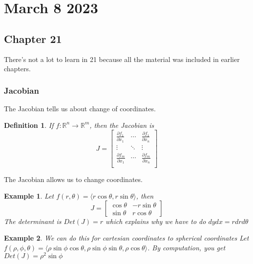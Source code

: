 \documentclass[11pt]{article}
\newtheorem{defn}{Definition}
\newtheorem{ex}{Example}
\begin{document}
            \section{March 8 2023}
            \subsection{Chapter 21}
            There's not a lot to learn in 21 because all the material was included in earlier chapters.
            \subsubsection{Jacobian}
            The Jacobian tells us about change of coordinates.
            \begin{defn}
              If $f: \mathbb{R}^{n} \to \mathbb{R}^{m}$, then the Jacobian is
              \[J =\begin{bmatrix}
                     \frac{\partial f_{1}}{\partial x_{1}} & \cdots & \frac{\partial f_{1}}{\partial x_{n}} \\
                     \vdots & \ddots & \vdots \\

                     \frac{\partial f_{m}}{\partial x_{1}} & \cdots & \frac{\partial f_{m}}{\partial x_{n}} \\
                   \end{bmatrix}\]
            \end{defn}
            The Jacobian allows us to change coordinates.
            \begin{ex}
              Let $f(r,\theta) = \langle r\cos\theta, r\sin\theta \rangle $,
              then
              \[J = \begin{bmatrix} \cos\theta  & -r\sin\theta \\ \sin\theta & r\cos\theta \end{bmatrix}\]
              The determinant is $Det(J) = r$ which explains why we have to do $dydx = r drd\theta$
              \end{ex}
              \begin{ex}
                We can do this for cartesian coordinates to spherical coordinates
                Let $f(\rho, \phi, \theta) = \langle \rho\sin\phi\cos\theta, \rho\sin\phi\sin\theta, \rho\cos\theta\rangle$.
                By computation, you get $Det(J) = \rho^{2}\sin\phi$
                \end{ex}
\end{document}

